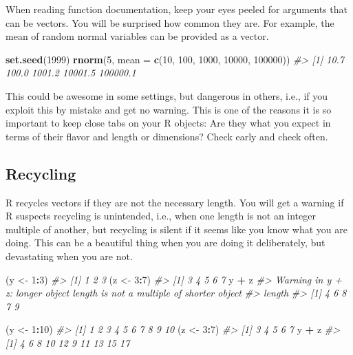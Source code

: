 \documentclass[
]{book}
\newenvironment{Shaded}{\begin{snugshade}}{\end{snugshade}}
\newcommand{\CommentTok}[1]{\textcolor[rgb]{0.56,0.35,0.01}{\textit{#1}}}
\newcommand{\DataTypeTok}[1]{\textcolor[rgb]{0.13,0.29,0.53}{#1}}
\newcommand{\DecValTok}[1]{\textcolor[rgb]{0.00,0.00,0.81}{#1}}
\newcommand{\KeywordTok}[1]{\textcolor[rgb]{0.13,0.29,0.53}{\textbf{#1}}}
\newcommand{\NormalTok}[1]{#1}
\newcommand{\OperatorTok}[1]{\textcolor[rgb]{0.81,0.36,0.00}{\textbf{#1}}}
\newcommand{\StringTok}[1]{\textcolor[rgb]{0.31,0.60,0.02}{#1}}
\begin{document}
When reading function documentation, keep your eyes peeled for arguments that can be vectors. You will be surprised how common they are. For example, the mean of random normal variables can be provided as a vector.

\begin{Shaded}
\begin{Highlighting}[]
\KeywordTok{set.seed}\NormalTok{(}\DecValTok{1999}\NormalTok{)}
\KeywordTok{rnorm}\NormalTok{(}\DecValTok{5}\NormalTok{, }\DataTypeTok{mean =} \KeywordTok{c}\NormalTok{(}\DecValTok{10}\NormalTok{, }\DecValTok{100}\NormalTok{, }\DecValTok{1000}\NormalTok{, }\DecValTok{10000}\NormalTok{, }\DecValTok{100000}\NormalTok{))}
\CommentTok{#> [1]     10.7    100.0   1001.2  10001.5 100000.1}
\end{Highlighting}
\end{Shaded}

This could be awesome in some settings, but dangerous in others, i.e., if you exploit this by mistake and get no warning. This is one of the reasons it is so important to keep close tabs on your R objects: Are they what you expect in terms of their flavor and length or dimensions? Check early and check often.

\hypertarget{recycling}{%
\subsection{Recycling}\label{recycling}}

R recycles vectors if they are not the necessary length. You will get a warning if R suspects recycling is unintended, i.e., when one length is not an integer multiple of another, but recycling is silent if it seems like you know what you are doing. This can be a beautiful thing when you are doing it deliberately, but devastating when you are not.

\begin{Shaded}
\begin{Highlighting}[]
\NormalTok{(y <-}\StringTok{ }\DecValTok{1}\OperatorTok{:}\DecValTok{3}\NormalTok{)}
\CommentTok{#> [1] 1 2 3}
\NormalTok{(z <-}\StringTok{ }\DecValTok{3}\OperatorTok{:}\DecValTok{7}\NormalTok{)}
\CommentTok{#> [1] 3 4 5 6 7}
\NormalTok{y }\OperatorTok{+}\StringTok{ }\NormalTok{z}
\CommentTok{#> Warning in y + z: longer object length is not a multiple of shorter object}
\CommentTok{#> length}
\CommentTok{#> [1] 4 6 8 7 9}

\NormalTok{(y <-}\StringTok{ }\DecValTok{1}\OperatorTok{:}\DecValTok{10}\NormalTok{)}
\CommentTok{#>  [1]  1  2  3  4  5  6  7  8  9 10}
\NormalTok{(z <-}\StringTok{ }\DecValTok{3}\OperatorTok{:}\DecValTok{7}\NormalTok{)}
\CommentTok{#> [1] 3 4 5 6 7}
\NormalTok{y }\OperatorTok{+}\StringTok{ }\NormalTok{z}
\CommentTok{#>  [1]  4  6  8 10 12  9 11 13 15 17}
\end{Highlighting}
\end{Shaded}
\end{document}
